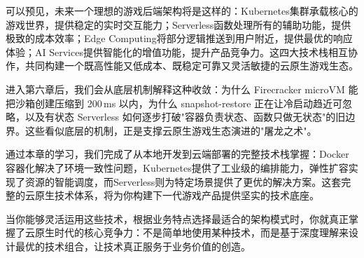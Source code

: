 可以预见，未来一个理想的游戏后端架构将是这样的：Kubernetes集群承载核心的游戏世界，提供稳定的实时交互能力；Serverless函数处理所有的辅助功能，提供极致的成本效率；Edge Computing将部分逻辑推送到用户附近，提供最优的响应体验；AI Services提供智能化的增值功能，提升产品竞争力。这四大技术栈相互协作，共同构建一个既高性能又低成本、既稳定可靠又灵活敏捷的云原生游戏生态。

进入第六章后，我们会从底层机制解释这种收敛：为什么 Firecracker microVM 能把沙箱创建压缩到 200\,ms 以内，为什么 snapshot-restore 正在让冷启动趋近可忽略，以及有状态 Serverless 如何逐步打破"容器负责状态、函数只做无状态"的旧边界。这些看似底层的机制，正是支撑云原生游戏生态演进的"屠龙之术"。

通过本章的学习，我们完成了从本地开发到云端部署的完整技术栈掌握：Docker容器化解决了环境一致性问题，Kubernetes提供了工业级的编排能力，弹性扩容实现了资源的智能调度，而Serverless则为特定场景提供了更优的解决方案。这套完整的云原生技术体系，将为你构建下一代游戏产品提供坚实的技术底座。

当你能够灵活运用这些技术，根据业务特点选择最适合的架构模式时，你就真正掌握了云原生时代的核心竞争力：不是简单地使用某种技术，而是基于深度理解来设计最优的技术组合，让技术真正服务于业务价值的创造。







